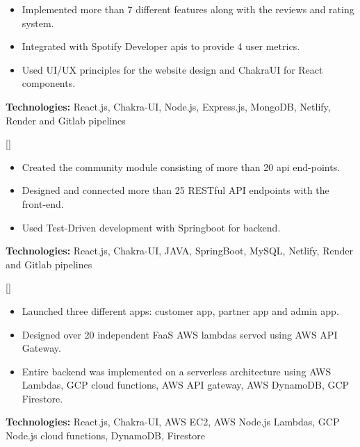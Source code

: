 \documentclass{article}
\begin{document}
\begin{itemize}
\item Implemented more than 7 different features along with the reviews and rating system.
\item Integrated with Spotify Developer apis to provide 4 user metrics.
\item Used UI/UX principles for the website design and ChakraUI for React components.

\end{itemize}

\textbf{Technologies:} React.js, Chakra-UI, Node.js, Express.js, MongoDB, Netlify, Render and Gitlab pipelines

[] 

\begin{itemize}
\item Created the community module consisting of more than 20 api end-points.
\item Designed and connected more than 25 RESTful API endpoints with the front-end.
\item Used Test-Driven development with Springboot for backend.

\end{itemize}

\textbf{Technologies:} React.js, Chakra-UI, JAVA, SpringBoot, MySQL, Netlify, Render and Gitlab pipelines


[] 

\begin{itemize}
\item Launched three different apps: customer app, partner app and admin app.
\item Designed over 20 independent FaaS AWS lambdas served using AWS API Gateway.
\item Entire backend was implemented on a serverless architecture using AWS Lambdas, GCP cloud functions, AWS API gateway, AWS DynamoDB, GCP Firestore.

\end{itemize}

\textbf{Technologies:} React.js, Chakra-UI, AWS EC2, AWS Node.js Lambdas, GCP Node.js cloud functions, DynamoDB, Firestore
\end{document}
